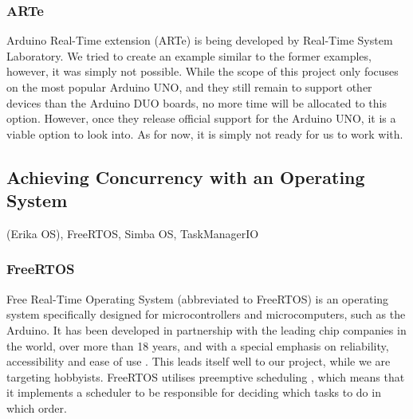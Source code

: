 \subsubsection{ARTe}

Arduino Real-Time extension (ARTe) is being developed by Real-Time System Laboratory. We tried to create an example similar to the former examples, however, it was simply not possible. While the scope of this project only focuses on the most popular Arduino UNO, and they still remain to support other devices than the Arduino DUO boards, no more time will be allocated to this option. However, once they release official support for the Arduino UNO, it is a viable option to look into. As for now, it is simply not ready for us to work with.



\subsection{Achieving Concurrency with an Operating System}
(Erika OS), FreeRTOS, Simba OS, TaskManagerIO






\subsubsection{FreeRTOS}

Free Real-Time Operating System (abbreviated to FreeRTOS) is an operating system specifically designed for microcontrollers and microcomputers, such as the Arduino. It has been developed in partnership with the leading chip companies in the world, over more than 18 years, and with a special emphasis on reliability, accessibility and ease of use \cite{AboutRTOS}. This leads itself well to our project, while we are targeting hobbyists. FreeRTOS utilises preemptive scheduling \cite{SchedulingRTOS}, which means that it implements a scheduler to be responsible for deciding which tasks to do in which order.



